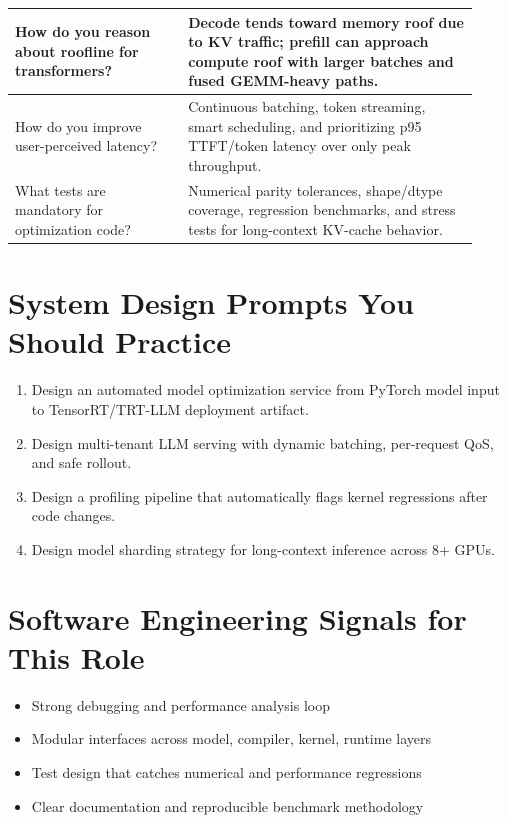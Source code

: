 \documentclass[11pt]{article}
\begin{document}
\begin{center}
\begin{tabular}{|p{0.34\linewidth}|p{0.58\linewidth}|}
\hline
How do you reason about roofline for transformers? & Decode tends toward memory roof due to KV traffic; prefill can approach compute roof with larger batches and fused GEMM-heavy paths. \\
\hline
How do you improve user-perceived latency? & Continuous batching, token streaming, smart scheduling, and prioritizing p95 TTFT/token latency over only peak throughput. \\
\hline
What tests are mandatory for optimization code? & Numerical parity tolerances, shape/dtype coverage, regression benchmarks, and stress tests for long-context KV-cache behavior. \\
\hline
\end{tabular}
\end{center}

\section{System Design Prompts You Should Practice}
\begin{enumerate}[leftmargin=*]
\item Design an automated model optimization service from PyTorch model input to TensorRT/TRT-LLM deployment artifact.
\item Design multi-tenant LLM serving with dynamic batching, per-request QoS, and safe rollout.
\item Design a profiling pipeline that automatically flags kernel regressions after code changes.
\item Design model sharding strategy for long-context inference across 8+ GPUs.
\end{enumerate}

\section{Software Engineering Signals for This Role}
\begin{itemize}[leftmargin=*]
\item Strong debugging and performance analysis loop
\item Modular interfaces across model, compiler, kernel, runtime layers
\item Test design that catches numerical and performance regressions
\item Clear documentation and reproducible benchmark methodology
\end{itemize}
\end{document}
